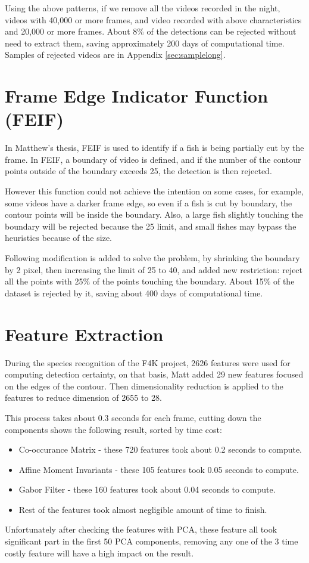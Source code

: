 \documentclass[bsc,logo,twoside,fullspacing,parskip]{infthesis}
\begin{document}
Using the above patterns, if we remove all the videos recorded in the night, videos with 40,000 or more frames, and video recorded with above characteristics and 20,000 or more frames. About 8\% of the detections can be rejected without need to extract them, saving approximately 200 days of computational time.
Samples of rejected videos are in Appendix \ref{sec:samplelong}.


\section{Frame Edge Indicator Function (FEIF)}

In Matthew's thesis, FEIF is used to identify if a fish is being partially cut by the frame. In FEIF, a boundary of video is defined, and if the number of the contour points outside of the boundary exceeds 25, the detection is then rejected.

However this function could not achieve the intention on some cases, for example, some videos have a darker frame edge, so even if a fish is cut by boundary, the contour points will be inside the boundary. Also, a large fish slightly touching the boundary will be rejected because the 25 limit, and small fishes may bypass the heuristics because of the size.

Following modification is added to solve the problem, by shrinking the boundary by 2 pixel, then increasing the limit of 25 to 40, and added new restriction: reject all the points with 25\% of the points touching the boundary. About 15\% of the dataset is rejected by it, saving about 400 days of computational time.

\section{Feature Extraction}

During the species recognition of the F4K project, 2626 features were used for computing detection certainty, on that basis, Matt added 29 new features focused on the edges of the contour. Then dimensionality reduction is applied to the features to reduce dimension of 2655 to 28. 

This process takes about 0.3 seconds for each frame, cutting down the components shows the following result, sorted by time cost:
\begin{itemize}
\item
Co-occurance Matrix - these 720 features took about 0.2 seconds to compute.
\item
Affine Moment Invariants - these 105 features took 0.05 seconds to compute.
\item
Gabor Filter - these 160 features took about 0.04 seconds to compute.
\item
Rest of the features took almost negligible amount of time to finish.
\end{itemize}
Unfortunately after checking the features with PCA, these feature all took significant part in the first 50 PCA components, removing any one of the 3 time costly feature will have a high impact on the result.
\end{document}
